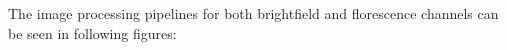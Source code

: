 \documentclass[pdftex,12pt,a4paper]{report}
\begin{document}
The image processing pipelines for both brightfield and florescence channels can be seen in following figures:


\end{document}
